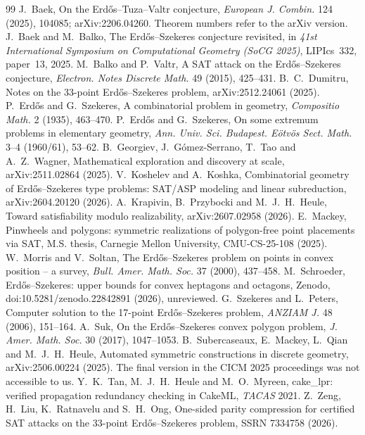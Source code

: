 \documentclass[11pt]{article}
\theoremstyle{remark}
\begin{document}
\begin{thebibliography}{99}
 J.~Baek, On the Erd\H{o}s--Tuza--Valtr conjecture, \emph{European J. Combin.} 124 (2025), 104085; arXiv:2206.04260. Theorem numbers refer to the arXiv version.
 J.~Baek and M.~Balko, The Erd\H{o}s--Szekeres conjecture revisited, in \emph{41st International Symposium on Computational Geometry (SoCG 2025)}, LIPIcs~332, paper~13, 2025.
 M.~Balko and P.~Valtr, A SAT attack on the Erd\H{o}s--Szekeres conjecture, \emph{Electron. Notes Discrete Math.} 49 (2015), 425--431.
 B.~C.~Dumitru, Notes on the 33-point Erd\H{o}s--Szekeres problem, arXiv:2512.24061 (2025).
 P.~Erd\H{o}s and G.~Szekeres, A combinatorial problem in geometry, \emph{Compositio Math.} 2 (1935), 463--470.
 P.~Erd\H{o}s and G.~Szekeres, On some extremum problems in elementary geometry, \emph{Ann. Univ. Sci. Budapest. E\"otv\"os Sect. Math.} 3--4 (1960/61), 53--62.
 B.~Georgiev, J.~G\'omez-Serrano, T.~Tao and A.~Z.~Wagner, Mathematical exploration and discovery at scale, arXiv:2511.02864 (2025).
 V.~Koshelev and A.~Koshka, Combinatorial geometry of Erd\H{o}s--Szekeres type problems: SAT/ASP modeling and linear subreduction, arXiv:2604.20120 (2026).
 A.~Krapivin, B.~Przybocki and M.~J.~H.~Heule, Toward satisfiability modulo realizability, arXiv:2607.02958 (2026).
 E.~Mackey, Pinwheels and polygons: symmetric realizations of polygon-free point placements via SAT, M.S. thesis, Carnegie Mellon University, CMU-CS-25-108 (2025).
 W.~Morris and V.~Soltan, The Erd\H{o}s--Szekeres problem on points in convex position -- a survey, \emph{Bull. Amer. Math. Soc.} 37 (2000), 437--458.
 M.~Schroeder, Erd\H{o}s--Szekeres: upper bounds for convex heptagons and octagons, Zenodo, doi:10.5281/zenodo.22842891 (2026), unreviewed.
 G.~Szekeres and L.~Peters, Computer solution to the 17-point Erd\H{o}s--Szekeres problem, \emph{ANZIAM J.} 48 (2006), 151--164.
 A.~Suk, On the Erd\H{o}s--Szekeres convex polygon problem, \emph{J. Amer. Math. Soc.} 30 (2017), 1047--1053.
 B.~Subercaseaux, E.~Mackey, L.~Qian and M.~J.~H.~Heule, Automated symmetric constructions in discrete geometry, arXiv:2506.00224 (2025). The final version in the CICM 2025 proceedings was not accessible to us.
 Y.~K.~Tan, M.~J.~H.~Heule and M.~O.~Myreen, cake\_lpr: verified propagation redundancy checking in CakeML, \emph{TACAS} 2021.
 Z.~Zeng, H.~Liu, K.~Ratnavelu and S.~H.~Ong, One-sided parity compression for certified SAT attacks on the 33-point Erd\H{o}s--Szekeres problem, SSRN 7334758 (2026).
\end{thebibliography}
\end{document}
